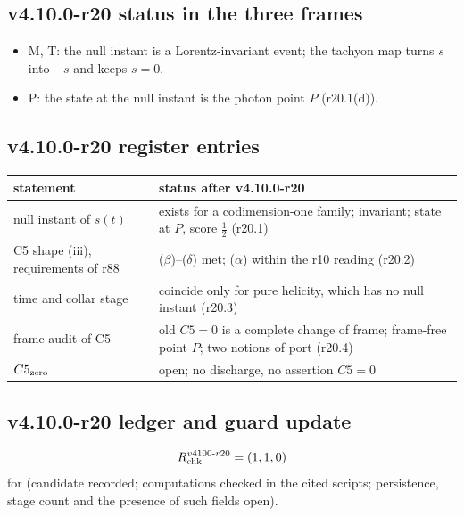 \subsection*{v4.10.0-r20 status in the three frames}
\label{subsec:v4100-r20-frames}

\begin{itemize}[leftmargin=2em]
\item M, T: the null instant is a Lorentz-invariant event; the tachyon map turns \(s\) into \(-s\) and keeps \(s=0\).
\item P: the state at the null instant is the photon point \(P\) (r20.1(d)).
\end{itemize}

\subsection*{v4.10.0-r20 register entries}
\label{subsec:v4100-r20-register}

\begin{center}
\small
\begin{tabular}{@{}>{\raggedright\arraybackslash}p{}>{\raggedright\arraybackslash}p{}@{}}
\toprule
statement & status after v4.10.0-r20\\
\midrule
null instant of \(s(t)\) & exists for a codimension-one family; invariant; state at \(P\), score \(\tfrac12\) (r20.1)\\
C5 shape (iii), requirements of r88 & (\(\beta\))--(\(\delta\)) met; (\(\alpha\)) within the r10 reading (r20.2)\\
time and collar stage & coincide only for pure helicity, which has no null instant (r20.3)\\
frame audit of C5 & old \(C5=0\) is a complete change of frame; frame-free point \(P\); two notions of port (r20.4)\\
\(C5_{\rm zero}\) & open; no discharge, no assertion \(C5=0\)\\
\bottomrule
\end{tabular}
\end{center}

\subsection*{v4.10.0-r20 ledger and guard update}
\label{subsec:v4100-r20-ledger-guard}

\[
R_{\rm chk}^{v4100\text{-}r20}=(1,1,0)
\]
for (candidate recorded; computations checked in the cited scripts; persistence, stage count and the presence of such fields open).

